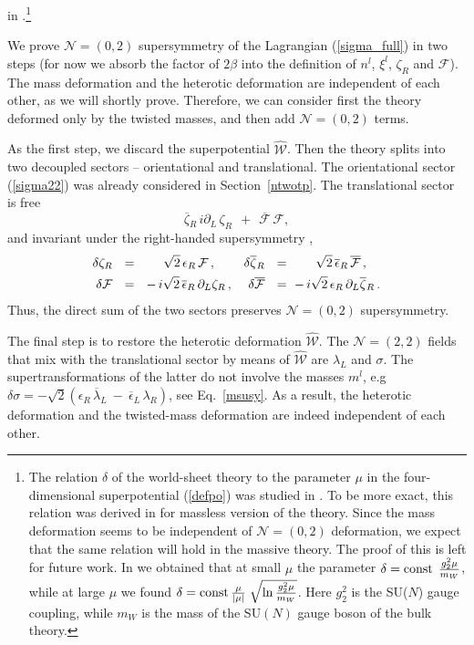 \documentclass[12pt]{article}
\newcommand{\ntwot}{${\mathcal N}= \left(2,2\right) $ }
\newcommand{\ntwoo}{${\mathcal N}= \left(0,2\right) $ }
\newcommand{\p}{\partial}
\newcommand{\ov}{\overline}
\newcommand{\mc}[1]{\mathcal{#1}}
\newcommand{\bzr}{\ov{\zeta}{}_R}
\newcommand{\zr}{\zeta_R}
\newcommand{\lar}{\lambda_R}
\newcommand{\blal}{\ov{\lambda}{}_L}
\newcommand{\ff}{\mc{F}}
\newcommand{\bff}{\ov{\mc{F}}}
\newcommand{\eer}{\epsilon_R}
\newcommand{\beer}{\ov{\epsilon}{}_R}
\newcommand{\beel}{\ov{\epsilon}{}_L}
\begin{document}
in \cite{SYhet}.\footnote{The relation  $\delta$ of the
world-sheet theory to the  parameter $\mu$
in the four-dimensional  superpotential (\ref{defpo}) was studied in
\cite{SYhet,BSYhet}. To be more exact, this 
relation was derived in \cite{SYhet,BSYhet} for massless
version of the theory. Since 
the mass deformation seems to be  independent of \ntwoo deformation,
 we expect that the same 
relation will hold in the massive theory. The proof of this is
left for  future work. In \cite{SYhet,BSYhet} we obtained that at small $\mu$ the parameter
$
\delta =
 {\rm const}\;\,\frac{g_2^2\mu}{m_W}$,
 while at large $\mu$ we found $\delta =
 {\rm const}\,\frac{\mu}{|\mu|}\;
 \sqrt{\ln{\frac{g^2_2\mu}{m_W}}}$.
 Here $g_2^2$ is the SU($N$) gauge coupling, 
while $m_W$ is the mass of the SU$(N)$ gauge boson of the bulk theory.} 


        We prove \ntwoo supersymmetry of the Lagrangian 
        (\ref{sigma_full}) in two steps
	(for now we absorb the factor of $ 2\beta $ into the definition of $ n^l $, $ \xi^l $,
        $ \zeta_R $ and $ \mc{F} $).
        The mass  deformation and the heterotic deformation are independent of each other, as we will shortly prove.
Therefore,   we can consider  first the theory deformed only by the
twisted masses, and then add \ntwoo terms.

As the first step, we discard the superpotential $ \hat{\mc{W}} $.
        Then the theory splits into two decoupled sectors -- orientational and translational. 
        The orientational sector (\ref{sigma22}) was 
        already considered in Section~\ref{ntwotp}.
  The translational sector is free
\[
	\bzr\, i\p_L\, \zr ~~+~~ \bff\,\ff ,
\]
	and invariant under the right-handed supersymmetry \cite{SYhet},
\begin{align}
%
\notag
        \delta \zr & ~~=~~ ~~~~ \sqrt{2}\, \eer\, \ff\,,
        &
        \delta \bzr & ~~=~~ ~~~~ \sqrt{2}\, \beer\, \bff\,,
        \\
%
\label{tsusy}
        \delta \ff & ~~=~~ -\, i\sqrt{2}\, \beer\, \p_L \zr\,,
        &
        \delta \bff & ~~=~ -\, i\sqrt{2}\, \eer\, \p_L \bzr
        \,.
\end{align}
	Thus, the direct sum of the two sectors preserves \ntwoo supersymmetry.
	
	The final step is to restore the heterotic deformation $ \hat{\mc{W}} $. 
	The \ntwot fields that mix with the translational sector by means
	of $ \hat{\mc{W}} $ are $ \lambda_L $ and $ \sigma $.
	The supertransformations of the latter do not involve the masses $ m^l $, 
	e.g $ \delta\sigma = -\sqrt{2}
                              \left( \eer\, \blal ~-~ \beel\,\lar \right)$, 
                              see Eq.~\eqref{msusy}.
As a result,  the heterotic deformation and the twisted-mass deformation are indeed independent
of each other.
\end{document}
